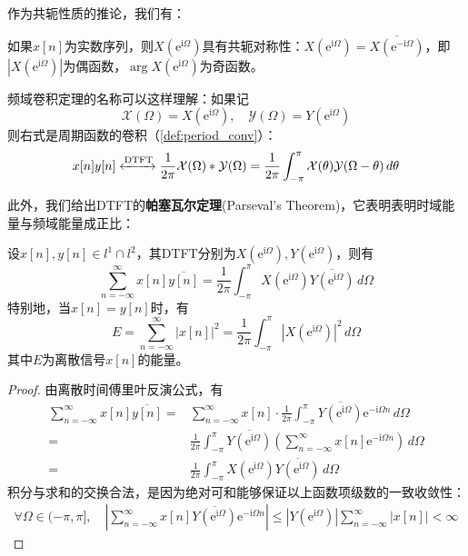 作为共轭性质的推论，我们有：
\begin{corollary}
    如果$x[n]$为实数序列，则$X(\mathrm{e}^{\mathrm{i}\Omega})$具有共轭对称性：$X(\mathrm{e}^{\mathrm{i}\Omega})=\overline{X\left(\mathrm{e}^{-\mathrm{i}\Omega}\right)}$，即$|X(\mathrm{e}^{\mathrm{i}\Omega})|$为偶函数，$\arg X(\mathrm{e}^{\mathrm{i}\Omega})$为奇函数。
\end{corollary}

频域卷积定理的名称可以这样理解：如果记
$$\mathcal{X} (\Omega)=X(\mathrm{e}^{\mathrm{i}\Omega}),\quad \mathcal{Y} (\Omega)=Y(\mathrm{e}^{\mathrm{i}\Omega})$$
则右式是周期函数的卷积（\cref{def:period_conv}）：
\[x[n]y[n]\xleftrightarrow{\mathrm{DTFT}}\frac{1}{2\pi}\mathcal{X} (\Omega)*\mathcal{Y} (\Omega)=\frac{1}{2\pi}\int_{-\pi}^{\pi}\mathcal{X} (\theta)\mathcal{Y} (\Omega-\theta)\,d\theta\]

此外，我们给出DTFT的\textbf{帕塞瓦尔定理}(Parseval's Theorem)，它表明表明时域能量与频域能量成正比：
\begin{theorem}[离散时间傅里叶变换的帕塞瓦尔定理]\label{thm:DTFT_plancherel}
    设$x[n],y[n]\in l^1\cap l^2$，其DTFT分别为$X(\mathrm{e}^{\mathrm{i}\Omega}),Y(\mathrm{e}^{\mathrm{i}\Omega})$，则有
    \[\sum_{n=-\infty}^{\infty}x[n]\overline{y[n]}=\frac{1}{2\pi}\int_{-\pi}^{\pi}X(\mathrm{e}^{\mathrm{i}\Omega})\overline{Y(\mathrm{e}^{\mathrm{i}\Omega})}\,d\Omega\]
    特别地，当$x[n]=y[n]$时，有
    \[E=\sum_{n=-\infty}^{\infty}|x[n]|^2=\frac{1}{2\pi}\int_{-\pi}^{\pi}|X(\mathrm{e}^{\mathrm{i}\Omega})|^2\,d\Omega\]
    其中$E$为离散信号$x[n]$的能量。
\end{theorem}
\begin{proof}
    由离散时间傅里叶反演公式，有
    \begin{align*}
        \sum_{n=-\infty}^{\infty}x[n]\overline{y[n]}=&\sum_{n=-\infty}^{\infty}x[n]\cdot\frac{1}{2\pi}\int_{-\pi}^{\pi}\overline{Y(\mathrm{e}^{\mathrm{i}\Omega})}\mathrm{e}^{-\mathrm{i}\Omega n}\,d\Omega\\
        =&\frac{1}{2\pi}\int_{-\pi}^{\pi}\overline{Y(\mathrm{e}^{\mathrm{i}\Omega})}\left(\sum_{n=-\infty}^{\infty}x[n]\mathrm{e}^{-\mathrm{i}\Omega n}\right)\,d\Omega\\
        =&\frac{1}{2\pi}\int_{-\pi}^{\pi}X(\mathrm{e}^{\mathrm{i}\Omega})\overline{Y(\mathrm{e}^{\mathrm{i}\Omega})}\,d\Omega
    \end{align*}
    积分与求和的交换合法，是因为绝对可和能够保证以上函数项级数的一致收敛性：\begin{align*}
    \forall\Omega\in(-\pi,\pi],\quad \left|\sum_{n=-\infty}^{\infty}x[n]\overline{Y(\mathrm{e}^{\mathrm{i}\Omega})}\mathrm{e}^{-\mathrm{i}\Omega n}\right|\leq\left|Y(\mathrm{e}^{\mathrm{i}\Omega})\right|\sum_{n=-\infty}^{\infty}|x[n]|<\infty
    \end{align*}
\end{proof}

